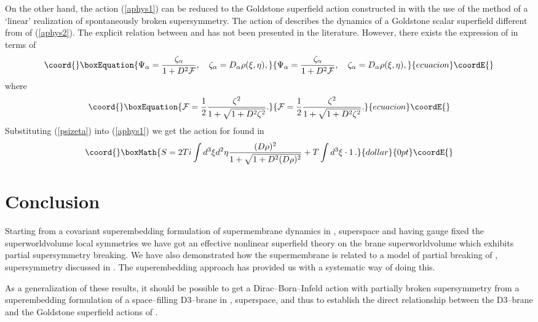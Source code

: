 \documentclass[a4paper,12pt]{article}
\begin{document}
On the other hand, the action (\ref{aphys1}) can be reduced to
the Goldstone superfield action constructed in \cite{ik1} with the
use of the method of a `linear' realization of spontaneously
broken supersymmetry. The action of \cite{ik1} describes the
dynamics of a Goldstone scalar superfield \myHighlight{$\rho(\xi,\eta)$}\coordHE{}
different from
\myHighlight{$\Phi(\xi,\eta)$}\coordHE{} of (\ref{aphys2}). The explicit relation between
\myHighlight{$\rho(\xi,\eta)$}\coordHE{} and \myHighlight{$\Phi(\xi,\eta)$}\coordHE{} has not been presented in the
literature. However, there exists \cite{ik1} the expression of
\myHighlight{$\Psi_\alpha(\xi,\eta)$}\coordHE{} in terms of \myHighlight{$\rho(\xi,\eta)$}\coordHE{}
\begin{equation}\coord{}\boxEquation{\label{psizeta}
\Psi_\alpha={\zeta_\alpha\over{ 1+D^2{\cal F}}}, \quad
\zeta_\alpha=D_\alpha \rho(\xi,\eta),
}{\Psi_\alpha={\zeta_\alpha\over{ 1+D^2{\cal F}}}, \quad
\zeta_\alpha=D_\alpha \rho(\xi,\eta),
}{ecuacion}\coordE{}\end{equation}
where
\begin{equation}\coord{}\boxEquation{\label{tilphi}
{\cal F}={1\over 2} {\zeta^2\over{1+\sqrt{1+D^2\zeta^2}}}.
}{{\cal F}={1\over 2} {\zeta^2\over{1+\sqrt{1+D^2\zeta^2}}}.
}{ecuacion}\coordE{}\end{equation}
Substituting (\ref{psizeta}) into (\ref{aphys1}) we get the
action for \myHighlight{$\rho(\xi,\eta)$}\coordHE{} found in \cite{ik1}
$$\coord{}\boxMath{
S=2Ti\int d^3\xi d^2\eta
{(D\rho)^2\over{1+\sqrt{1+D^2(D\rho)^2}}}+T\int d^3\xi \cdot 1\,.
}{dollar}{0pt}\coordE{}$$

\section{Conclusion}
Starting from a covariant superembedding formulation of
supermembrane dynamics in \coordHE{}, \coordHE{} superspace and having
gauge fixed the superworldvolume local symmetries we have got an
effective nonlinear superfield theory on the brane
superworldvolume which exhibits partial supersymmetry breaking.
We have also demonstrated how the supermembrane is related to a
model of partial breaking of \coordHE{}, \coordHE{} supersymmetry discussed
in \cite{ik1}. The superembedding approach has provided us with a
systematic way of doing this.

As a generalization of these results, it should be possible to get
a \coordHE{} Dirac--Born--Infeld action with partially broken \coordHE{}
supersymmetry from a superembedding formulation of a
space--filling D3--brane in \coordHE{}, \coordHE{} superspace, and thus to
establish the direct relationship between the D3--brane and the
Goldstone superfield actions of \cite{bg2,rt,fer}.
\end{document}
